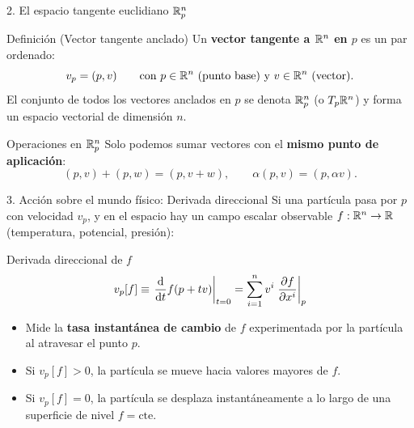 \documentclass[10pt,aspectratio=169]{beamer}
\begin{document}
\begin{frame}{2. El espacio tangente euclidiano $\mathbb{R}^n_p$}
  \begin{block}{Definición (Vector tangente anclado)}
    Un \textbf{vector tangente a $\mathbb{R}^n$ en $p$} es un par ordenado:
    \[
    v_p = (p, v) \qquad \text{con } p \in \mathbb{R}^n \text{ (punto base) y } v \in \mathbb{R}^n \text{ (vector)}.
    \]
    El conjunto de todos los vectores anclados en $p$ se denota $\mathbb{R}^n_p$ (o $T_p\mathbb{R}^n$) y forma un espacio vectorial de dimensión $n$.
  \end{block}

  \vspace{0.3cm}
  \begin{exampleblock}{Operaciones en $\mathbb{R}^n_p$}
    Solo podemos sumar vectores con el \textbf{mismo punto de aplicación}:
    \[
    (p, v) + (p, w) = (p, v + w), \qquad \alpha (p, v) = (p, \alpha v).
    \]
  \end{exampleblock}
\end{frame}

\begin{frame}{3. Acción sobre el mundo físico: Derivada direccional}
  Si una partícula pasa por $p$ con velocidad $v_p$, y en el espacio hay un campo escalar observable $f: \mathbb{R}^n \to \mathbb{R}$ (temperatura, potencial, presión):
  
  \begin{block}{Derivada direccional de $f$}
    \[
    v_p[f] \equiv \left. \frac{\mathrm{d}}{\mathrm{d} t} f(p + t v) \right|_{t=0} = \sum_{i=1}^n v^i \left.\frac{\partial f}{\partial x^i}\right|_p
    \]
  \end{block}

  \vspace{0.2cm}
  \begin{itemize}
    \item Mide la \textbf{tasa instantánea de cambio} de $f$ experimentada por la partícula al atravesar el punto $p$.
    \item Si $v_p[f] > 0$, la partícula se mueve hacia valores mayores de $f$.
    \item Si $v_p[f] = 0$, la partícula se desplaza instantáneamente a lo largo de una superficie de nivel $f = \text{cte}$.
  \end{itemize}
\end{frame}
\end{document}
